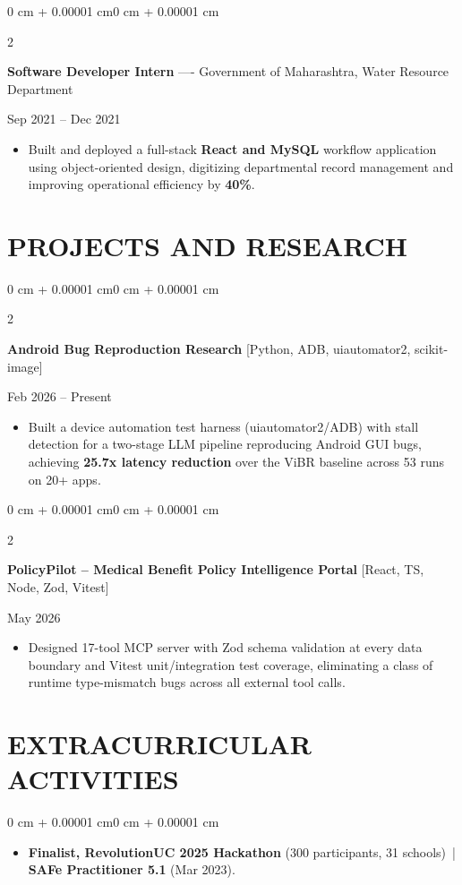 \documentclass[10pt, letterpaper]{article}
\newenvironment{highlights}{
    \begin{itemize}[
        topsep=0.10 cm,
        parsep=0.06 cm,
        partopsep=0pt,
        itemsep=0.06 cm,
        leftmargin=12pt
    ]
}{
    \end{itemize}
}
\newenvironment{onecolentry}{
    \begin{adjustwidth}{0 cm + 0.00001 cm}{0 cm + 0.00001 cm}
}{
    \end{adjustwidth}
}
\newenvironment{twocolentry}[2][]{
    \onecolentry
    \def\secondColumn{#2}
    \setcolumnwidth{\fill, 4.5 cm}
    \begin{paracol}{2}
}{
    \switchcolumn \raggedleft \secondColumn
    \end{paracol}
    \endonecolentry
}
\begin{document}
\vspace{0.15 cm}

\begin{twocolentry}{Sep 2021 -- Dec 2021}
\textbf{Software Developer Intern} ---- Government of Maharashtra, Water Resource Department
\end{twocolentry}
\begin{highlights}
  \item Built and deployed a full-stack \textbf{React and MySQL} workflow application using object-oriented design, digitizing departmental record management and improving operational efficiency by \textbf{40\%}.
\end{highlights}

\section{PROJECTS AND RESEARCH}
\begin{twocolentry}{Feb 2026 -- Present}
\textbf{Android Bug Reproduction Research} [Python, ADB, uiautomator2, scikit-image]
\end{twocolentry}
\begin{highlights}
  \item Built a device automation test harness (uiautomator2/ADB) with stall detection for a two-stage LLM pipeline reproducing Android GUI bugs, achieving \textbf{25.7x latency reduction} over the ViBR baseline across 53 runs on 20+ apps.
\end{highlights}

\vspace{0.12 cm}

\begin{twocolentry}{May 2026}
\textbf{PolicyPilot -- Medical Benefit Policy Intelligence Portal} [React, TS, Node, Zod, Vitest]
\end{twocolentry}
\begin{highlights}
  \item Designed 17-tool MCP server with Zod schema validation at every data boundary and Vitest unit/integration test coverage, eliminating a class of runtime type-mismatch bugs across all external tool calls.
\end{highlights}

\section{EXTRACURRICULAR ACTIVITIES}
\begin{onecolentry}
\begin{highlights}
  \item \textbf{Finalist, RevolutionUC 2025 Hackathon} (300 participants, 31 schools) \,|\, \textbf{SAFe Practitioner 5.1} (Mar 2023).
\end{highlights}
\end{onecolentry}
\end{document}
